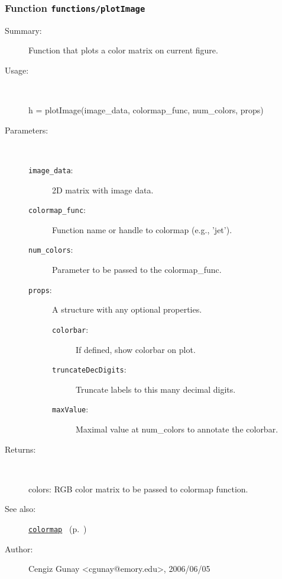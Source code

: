 \subsubsection[Function \texttt{plotImage}]{Function \texttt{functions/plotImage}}%
%
\label{ref_functions__plotImage}%
\hypertarget{ref_functions__plotImage}{}%
\begin{description}
\item[Summary:]Function that plots a color matrix on current figure.
%
\item[Usage:]~%
\begin{lyxcode}%
h = plotImage(image\_data, colormap\_func, num\_colors, props)
%
\end{lyxcode}%
%
%
\item[Parameters:]~
\begin{description}%
\item[\texttt{image\_data}:]
 2D matrix with image data.
\item[\texttt{colormap\_func}:]
 Function name or handle to colormap (e.g., 'jet').
\item[\texttt{num\_colors}:]
 Parameter to be passed to the colormap\_func.
\item[\texttt{props}:]
 A structure with any optional properties.
\begin{description}%
\item[\texttt{colorbar}:]
 If defined, show colorbar on plot.
\item[\texttt{truncateDecDigits}:]
 Truncate labels to this many decimal digits.
\item[\texttt{maxValue}:]
 Maximal value at num\_colors to annotate the colorbar.
\end{description}%
\end{description}%
%
\item[Returns:]~

	colors: RGB color matrix to be passed to colormap function.
%
%
\item[See also:]%
\hyperlink{ref_colormap}{\texttt{colormap}}%
\ (p.~\pageref{ref_colormap})%
%
%
\item[Author:]%
Cengiz Gunay <cgunay@emory.edu>, 2006/06/05%
\end{description}
\methodline%
